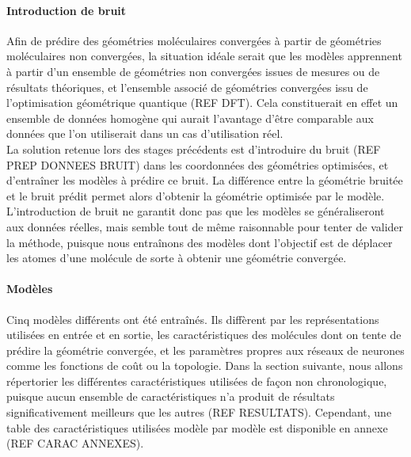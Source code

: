 \paragraph{Introduction de bruit} Afin de prédire des géométries moléculaires convergées à partir de géométries moléculaires non convergées, la situation idéale serait que les modèles apprennent à partir d'un ensemble de géométries non convergées issues de mesures ou de résultats théoriques, et l'ensemble associé de géométries convergées issu de l'optimisation géométrique quantique (REF DFT). Cela constituerait en effet un ensemble de données homogène qui aurait l'avantage d'être comparable aux données que l'on utiliserait dans un cas d'utilisation réel.\\
La solution retenue lors des stages précédents est d'introduire du bruit (REF PREP DONNEES BRUIT) dans les coordonnées des géométries optimisées, et d'entraîner les modèles à prédire ce bruit. La différence entre la géométrie bruitée et le bruit prédit permet alors d'obtenir la géométrie optimisée par le modèle. L'introduction de bruit ne garantit donc pas que les modèles se généraliseront aux données réelles, mais semble tout de même raisonnable pour tenter de valider la méthode, puisque nous entraînons des modèles dont l'objectif est de déplacer les atomes d'une molécule de sorte à obtenir une géométrie convergée.

\paragraph{Modèles} Cinq modèles différents ont été entraînés. Ils diffèrent par les représentations utilisées en entrée et en sortie, les caractéristiques des molécules dont on tente de prédire la géométrie convergée, et les paramètres propres aux réseaux de neurones comme les fonctions de coût ou la topologie. Dans la section suivante, nous allons répertorier les différentes caractéristiques utilisées de façon non chronologique, puisque aucun ensemble de caractéristiques n'a produit de résultats significativement meilleurs que les autres (REF RESULTATS). Cependant, une table des caractéristiques utilisées modèle par modèle est disponible en annexe (REF CARAC ANNEXES).